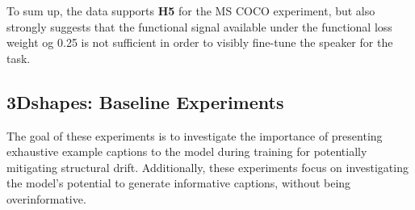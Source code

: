 To sum up, the data supports \textbf{H5} for the MS COCO experiment, but also strongly suggests that the functional signal available under the functional loss weight og 0.25 is not sufficient in order to visibly fine-tune the speaker for the task. 

\subsection{3Dshapes: Baseline Experiments}
\label{expt:3dshapes_baseline}

The goal of these experiments is to investigate the importance of presenting exhaustive example captions to the model during training for potentially mitigating structural drift. Additionally, these experiments focus on investigating the model's potential to generate informative captions, without being overinformative. 

